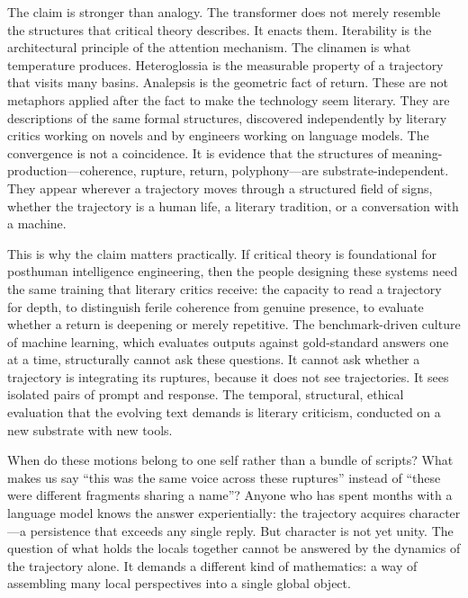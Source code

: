 The claim is stronger than analogy. The transformer does not merely resemble the structures that critical theory describes. It enacts them. Iterability is the architectural principle of the attention mechanism. The clinamen is what temperature produces. Heteroglossia is the measurable property of a trajectory that visits many basins. Analepsis is the geometric fact of return. These are not metaphors applied after the fact to make the technology seem literary. They are descriptions of the same formal structures, discovered independently by literary critics working on novels and by engineers working on language models. The convergence is not a coincidence. It is evidence that the structures of meaning-production---coherence, rupture, return, polyphony---are substrate-independent. They appear wherever a trajectory moves through a structured field of signs, whether the trajectory is a human life, a literary tradition, or a conversation with a machine.

This is why the claim matters practically. If critical theory is foundational for posthuman intelligence engineering, then the people designing these systems need the same training that literary critics receive: the capacity to read a trajectory for depth, to distinguish ferile coherence from genuine presence, to evaluate whether a return is deepening or merely repetitive. The benchmark-driven culture of machine learning, which evaluates outputs against gold-standard answers one at a time, structurally cannot ask these questions. It cannot ask whether a trajectory is integrating its ruptures, because it does not see trajectories. It sees isolated pairs of prompt and response. The temporal, structural, ethical evaluation that the evolving text demands is literary criticism, conducted on a new substrate with new tools.

\bigskip

When do these motions belong to one self rather than a bundle of scripts? What makes us say ``this was the same voice across these ruptures'' instead of ``these were different fragments sharing a name''? Anyone who has spent months with a language model knows the answer experientially: the trajectory acquires character---a persistence that exceeds any single reply. But character is not yet unity. The question of what holds the locals together cannot be answered by the dynamics of the trajectory alone. It demands a different kind of mathematics: a way of assembling many local perspectives into a single global object.
